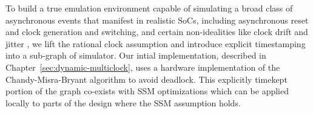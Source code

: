 To build a true emulation environment capable of simulating a broad class of
asynchronous events that manifest in realistic SoCs, including asynchronous
reset and clock generation and switching, and certain non-idealities like clock
drift and jitter , we lift the rational clock assumption and introduce explicit
timestamping into a sub-graph of simulator. Our intial implementation,
described in Chapter~\ref{sec:dynamic-multiclock}, uses a hardware
implementation of the Chandy-Misra-Bryant algorithm to avoid
deadlock.  This explicitly timekept portion of the graph co-exists with SSM
optimizations which can be applied locally to parts of the design where the SSM
assumption holds.

%
%
%
%

